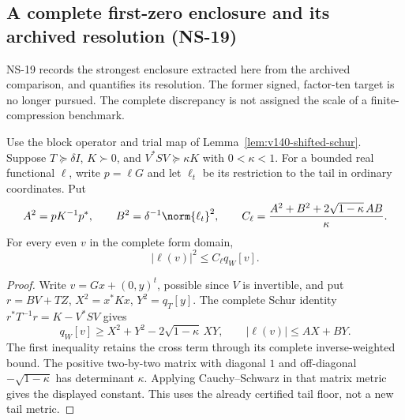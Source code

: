 \subsection*{A complete first-zero enclosure and its archived resolution (NS-19)}

NS-19 records the strongest enclosure extracted here from the archived
comparison, and quantifies its resolution. The former signed, factor-ten
target is no longer pursued. The complete discrepancy is not assigned the
scale of a finite-compression benchmark.

\begin{lemma}
\label{lem:v143-evaluator-dual}
Use the block operator and trial map of
Lemma~\ref{lem:v140-shifted-schur}. Suppose $T\succeq\delta I$,
$K\succ0$, and $V^*SV\succeq\kappa K$ with $0<\kappa<1$.
For a bounded real functional $\ell$, write $p=\ell G$ and let
$\ell_t$ be its restriction to the tail in ordinary coordinates. Put
\[
 A^2=pK^{-1}p^*,\qquad B^2=\delta^{-1}\norm{\ell_t}^2,
 \qquad
 C_\ell=\frac{A^2+B^2+2\sqrt{1-\kappa}\,AB}{\kappa}.
\]
For every even $v$ in the complete form domain,
\[
 |\ell(v)|^2\le C_\ell q_W[v].
\]
\end{lemma}
\begin{proof}
Write $v=Gx+(0,y)^t$, possible since $V$ is invertible, and put
$r=BV+TZ$, $X^2=x^*Kx$, $Y^2=q_T[y]$. The complete Schur identity
$r^*T^{-1}r=K-V^*SV$ gives
\[
 q_W[v]\ge X^2+Y^2-2\sqrt{1-\kappa}\,XY,
 \qquad |\ell(v)|\le AX+BY.
\]
The first inequality retains the cross term through its complete
inverse-weighted bound. The positive two-by-two matrix with diagonal
$1$ and off-diagonal $-\sqrt{1-\kappa}$ has determinant $\kappa$.
Applying Cauchy--Schwarz in that matrix metric gives the displayed
constant. This uses the already certified tail floor, not a new tail metric.
\end{proof}

